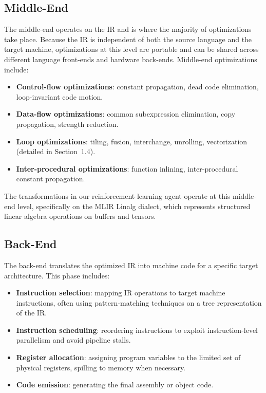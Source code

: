 \subsection{Middle-End}

The middle-end operates on the IR and is where the majority of optimizations take place. Because the IR is independent of both the source language and the target machine, optimizations at this level are portable and can be shared across different language front-ends and hardware back-ends. Middle-end optimizations include:

\begin{itemize}
    \item \textbf{Control-flow optimizations}: constant propagation, dead code elimination, loop-invariant code motion.
    \item \textbf{Data-flow optimizations}: common subexpression elimination, copy propagation, strength reduction.
    \item \textbf{Loop optimizations}: tiling, fusion, interchange, unrolling, vectorization (detailed in Section~1.4).
    \item \textbf{Inter-procedural optimizations}: function inlining, inter-procedural constant propagation.
\end{itemize}

The transformations in our reinforcement learning agent operate at this middle-end level, specifically on the MLIR Linalg dialect, which represents structured linear algebra operations on buffers and tensors.

\subsection{Back-End}

The back-end translates the optimized IR into machine code for a specific target architecture. This phase includes:

\begin{itemize}
    \item \textbf{Instruction selection}: mapping IR operations to target machine instructions, often using pattern-matching techniques on a tree representation of the IR.
    \item \textbf{Instruction scheduling}: reordering instructions to exploit instruction-level parallelism and avoid pipeline stalls.
    \item \textbf{Register allocation}: assigning program variables to the limited set of physical registers, spilling to memory when necessary.
    \item \textbf{Code emission}: generating the final assembly or object code.
\end{itemize}

